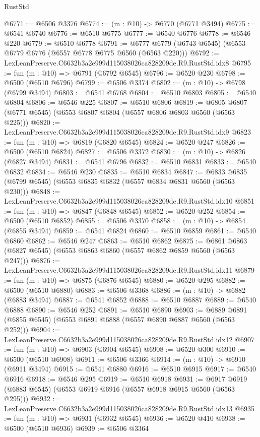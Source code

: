 \begin{lexlean}{RustStd}
\begin{coremodule}
@6771 := @6506 @3376
@6774 := (m : @10) -> @6770 (@6771 @3494)
@6775 := @6541 @6740
@6776 := @6510 @6775
@6777 := @6540 @6776
@6778 := @6546 @220
@6779 := @6510 @6778
@6791 := @6777 @6779 (@6743 @6545) (@6553 @6779 @6776 (@6557 @6778 @6775 @6560 (@6563 @220)))
@6792 := LexLeanPreserve.C6632b3a2e999d115038026ca828209de.R9.RustStd.idx8
@6795 := fun (m : @10) => @6791 (@6792 @6545)
@6796 := @6520 @230
@6798 := @6500 (@6510 @6796)
@6799 := @6506 @3374
@6802 := (m : @10) -> @6798 (@6799 @3494)
@6803 := @6541 @6768
@6804 := @6510 @6803
@6805 := @6540 @6804
@6806 := @6546 @225
@6807 := @6510 @6806
@6819 := @6805 @6807 (@6771 @6545) (@6553 @6807 @6804 (@6557 @6806 @6803 @6560 (@6563 @225)))
@6820 := LexLeanPreserve.C6632b3a2e999d115038026ca828209de.R9.RustStd.idx9
@6823 := fun (m : @10) => @6819 (@6820 @6545)
@6824 := @6520 @247
@6826 := @6500 (@6510 @6824)
@6827 := @6506 @3372
@6830 := (m : @10) -> @6826 (@6827 @3494)
@6831 := @6541 @6796
@6832 := @6510 @6831
@6833 := @6540 @6832
@6834 := @6546 @230
@6835 := @6510 @6834
@6847 := @6833 @6835 (@6799 @6545) (@6553 @6835 @6832 (@6557 @6834 @6831 @6560 (@6563 @230)))
@6848 := LexLeanPreserve.C6632b3a2e999d115038026ca828209de.R9.RustStd.idx10
@6851 := fun (m : @10) => @6847 (@6848 @6545)
@6852 := @6520 @252
@6854 := @6500 (@6510 @6852)
@6855 := @6506 @3370
@6858 := (m : @10) -> @6854 (@6855 @3494)
@6859 := @6541 @6824
@6860 := @6510 @6859
@6861 := @6540 @6860
@6862 := @6546 @247
@6863 := @6510 @6862
@6875 := @6861 @6863 (@6827 @6545) (@6553 @6863 @6860 (@6557 @6862 @6859 @6560 (@6563 @247)))
@6876 := LexLeanPreserve.C6632b3a2e999d115038026ca828209de.R9.RustStd.idx11
@6879 := fun (m : @10) => @6875 (@6876 @6545)
@6880 := @6520 @295
@6882 := @6500 (@6510 @6880)
@6883 := @6506 @3368
@6886 := (m : @10) -> @6882 (@6883 @3494)
@6887 := @6541 @6852
@6888 := @6510 @6887
@6889 := @6540 @6888
@6890 := @6546 @252
@6891 := @6510 @6890
@6903 := @6889 @6891 (@6855 @6545) (@6553 @6891 @6888 (@6557 @6890 @6887 @6560 (@6563 @252)))
@6904 := LexLeanPreserve.C6632b3a2e999d115038026ca828209de.R9.RustStd.idx12
@6907 := fun (m : @10) => @6903 (@6904 @6545)
@6908 := @6520 @300
@6910 := @6500 (@6510 @6908)
@6911 := @6506 @3366
@6914 := (m : @10) -> @6910 (@6911 @3494)
@6915 := @6541 @6880
@6916 := @6510 @6915
@6917 := @6540 @6916
@6918 := @6546 @295
@6919 := @6510 @6918
@6931 := @6917 @6919 (@6883 @6545) (@6553 @6919 @6916 (@6557 @6918 @6915 @6560 (@6563 @295)))
@6932 := LexLeanPreserve.C6632b3a2e999d115038026ca828209de.R9.RustStd.idx13
@6935 := fun (m : @10) => @6931 (@6932 @6545)
@6936 := @6520 @410
@6938 := @6500 (@6510 @6936)
@6939 := @6506 @3364

\end{coremodule}
\end{lexlean}
